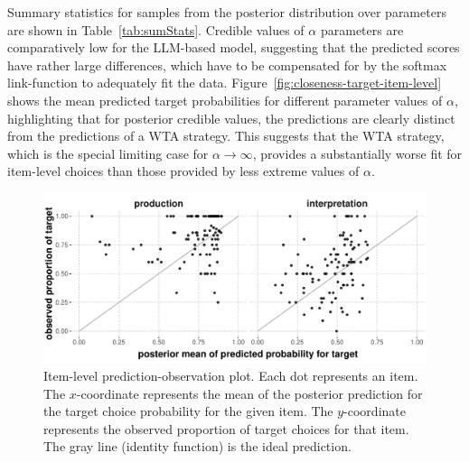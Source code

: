 \documentclass[fleqn]{article}
\begin{document}
Summary statistics for samples from the posterior distribution over parameters are shown in Table~\ref{tab:sumStats}.
Credible values of $\alpha$ parameters are comparatively low for the LLM-based model, suggesting that the predicted scores have rather large differences, which have to be compensated for by the softmax link-function to adequately fit the data.
Figure~\ref{fig:closeness-target-item-level} shows the mean predicted target probabilities for different parameter values of $\alpha$, highlighting that for posterior credible values, the predictions are clearly distinct from the predictions of a WTA strategy.
This suggests that the WTA strategy, which is the special limiting case for $\alpha \rightarrow \infty$, provides a substantially worse fit for item-level choices than those provided by less extreme values of $\alpha$.

\begin{figure}[t]
  \centering

  \includegraphics[width = 0.9\linewidth]{00-pics/item-combined-obs-pred.pdf}

  \caption{
    Item-level prediction-observation plot.
    Each dot represents an item.
    The $x$-coordinate represents the mean of the posterior prediction for the target choice probability for the given item.
    The $y$-coordinate represents the observed proportion of target choices for that item.
    The gray line (identity function) is the ideal prediction.
  }
  \label{fig:item-level-obs-pred}
\end{figure}
\end{document}
